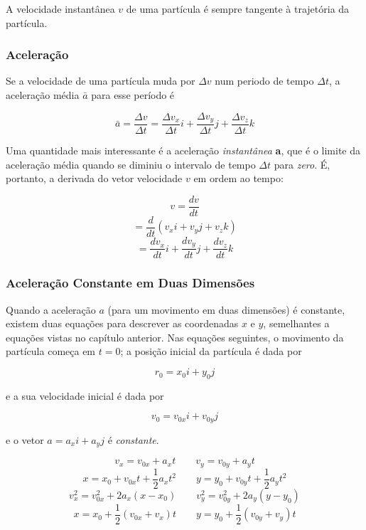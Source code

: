 A velocidade instantânea $v$ de uma partícula é sempre tangente à trajetória da partícula.

\subsubsection{Aceleração}
Se a velocidade de uma partícula muda por $\Delta v$ num periodo de tempo $\Delta t$, a aceleração média $\bar{a}$ para esse período é

\begin{equation}
    \bar{a}=\frac{\Delta v}{\Delta t}=\frac{\Delta v_x}{\Delta t}i+\frac{\Delta v_y}{\Delta t}j+\frac{\Delta v_z}{\Delta t}k
\end{equation}

Uma quantidade mais interessante é a aceleração \emph{instantânea} \textbf{a}, que é o limite da aceleração média quando se diminiu o intervalo de tempo $\Delta t$ para \emph{zero}. É, portanto, a derivada do vetor velocidade $v$ em ordem ao tempo:

\begin{equation}
    v=\frac{dv}{dt}
\end{equation}
\begin{equation}
    =\frac{d}{dt}(v_xi+v_yj+v_zk)
\end{equation}
\begin{equation}
    =\frac{dv_x}{dt}i+\frac{dv_y}{dt}j+\frac{dv_z}{dt}k
\end{equation}

\subsubsection{Aceleração Constante em Duas Dimensões}
Quando a aceleração $a$ (para um movimento em duas dimensões) é constante, existem duas equações para descrever as coordenadas $x$ e $y$, semelhantes a equações vistas no capítulo anterior. Nas equações seguintes, o movimento da partícula começa em $t=0$; a posição inicial da partícula é dada por

$$
r_0=x_0i+y_0j
$$

e a sua velocidade inicial é dada por

$$
v_0=v_{0x}i+v_{0y}j
$$

e o vetor $a=a_xi+a_yj$ é \emph{constante}.


\begin{equation}
    v_x=v_{0x}+a_xt \qquad v_y=v_{0y}+a_yt
\end{equation}
\begin{equation}
    x=x_{0}+v_{0x}t+\frac{1}{2}a_xt^2 \qquad y=y_{0}+v_{0y}t+\frac{1}{2}a_yt^2
\end{equation}
\begin{equation}
    v_x^2=v_{0x}^2+2a_x(x-x_0) \qquad v_y^2=v_{0y}^2+2a_y(y-y_0)
\end{equation}
\begin{equation}
    x=x_{0}+\frac{1}{2}(v_{0x}+v_x)t \qquad y=y_{0}+\frac{1}{2}(v_{0y}+v_y)t
\end{equation}


